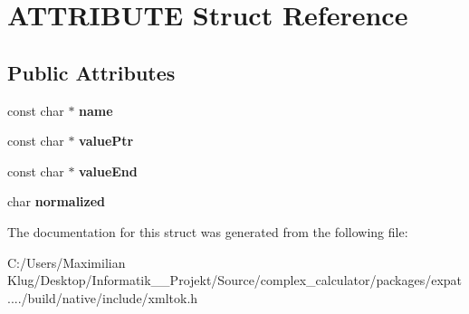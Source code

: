\hypertarget{struct_a_t_t_r_i_b_u_t_e}{}\section{A\+T\+T\+R\+I\+B\+U\+TE Struct Reference}
\label{struct_a_t_t_r_i_b_u_t_e}
\subsection*{Public Attributes}
\begin{DoxyCompactItemize}
\item 
\mbox{\label{struct_a_t_t_r_i_b_u_t_e_a93c42f62f5225db49d1c8fa995df0b98}} 
const char $\ast$ {\bfseries name}
\item 
\mbox{\label{struct_a_t_t_r_i_b_u_t_e_aa74f5eb3f75d6a6e28fbf0c020bbe021}} 
const char $\ast$ {\bfseries value\+Ptr}
\item 
\mbox{\label{struct_a_t_t_r_i_b_u_t_e_ad551901b9645e6abea66612eda5ac49e}} 
const char $\ast$ {\bfseries value\+End}
\item 
\mbox{\label{struct_a_t_t_r_i_b_u_t_e_ab58ed5e3d2fd99385f6f7166ffead55a}} 
char {\bfseries normalized}
\end{DoxyCompactItemize}


The documentation for this struct was generated from the following file\+:\begin{DoxyCompactItemize}
\item 
C\+:/\+Users/\+Maximilian Klug/\+Desktop/\+Informatik\+\_\+\_\+\+Projekt/\+Source/complex\+\_\+calculator/packages/expat..../build/native/include/xmltok.\+h\end{DoxyCompactItemize}
